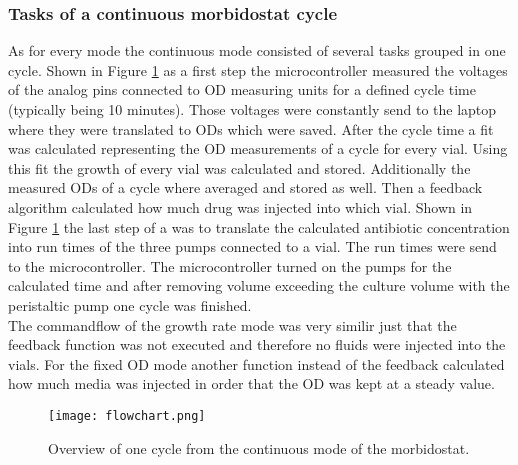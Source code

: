 \subsubsection{Tasks of a continuous morbidostat cycle}
As for every mode the continuous mode consisted of several tasks grouped in one cycle. Shown in Figure \ref{figure:flowchart} as a first step the microcontroller measured the voltages of the analog pins connected to OD measuring units for a defined cycle time (typically being 10 minutes). Those voltages were constantly send to the laptop where they were translated to ODs which were saved. After the cycle time a fit was calculated representing the OD measurements of a cycle for every vial. Using this fit the growth of every vial was calculated and stored. Additionally the measured ODs of a cycle where averaged and stored as well. Then a feedback algorithm calculated how much drug was injected into which vial. Shown in Figure \ref{figure:flowchart} the last step of a was to translate the calculated antibiotic concentration into run times of the three pumps connected to a vial. The run times were send to the microcontroller. The microcontroller turned on the pumps for the calculated time and after removing volume exceeding the culture volume with the peristaltic pump one cycle was finished. \\
The commandflow of the growth rate mode was very similir just that the feedback function was not executed and therefore no fluids were injected into the vials. For the fixed OD mode another function instead of the feedback  calculated how much media was injected in order that the OD was kept at a steady value. 
 
\begin{figure}
	\texttt{[image: flowchart.png]}
	\caption{Overview of one cycle from the continuous mode of the morbidostat.}
	\label{figure:flowchart}	
\end{figure}

